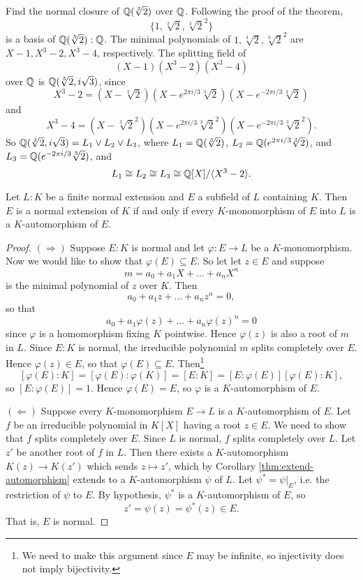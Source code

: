 \begin{example}
  Find the normal closure of $\mathbb{Q}(\sqrt[3]{2})$ over $\mathbb{Q}$.
  Following the proof of the theorem,
  \[
    \{1, \sqrt[3]{2}, \sqrt[3]{2}^2\}
  \]
  is a basis of $\mathbb{Q}(\sqrt[3]{2}) : \mathbb{Q}$. The minimal
  polynomials of $1, \sqrt[3]{2}, \sqrt[3]{2}^2$ are
  $X - 1, X^3 - 2, X^3 - 4$, respectively. The
  splitting field of
  \[
    (X - 1)(X^3 - 2)(X^3 - 4)
  \]
  over $\mathbb{Q}$ is $\mathbb{Q}(\sqrt[3]{2}, i\sqrt{3})$, since
  \[
    X^3 - 2 = (X - \sqrt[3]{2})(X - e^{2\pi i / 3} \sqrt[3]{2})(X - e^{-2\pi i / 3} \sqrt[3]{2})
  \]
  and
  \[
    X^3 - 4 = (X - \sqrt[3]{2}^2)(X - e^{2\pi i / 3} \sqrt[3]{2}^2)(X - e^{-2\pi i / 3} \sqrt[3]{2}^2).
  \]
  So $\mathbb{Q}(\sqrt[3]{2}, i\sqrt{3}) = L_1 \lor L_2 \lor L_3$,
  where $L_1 = \mathbb{Q}(\sqrt[3]{2})$, $L_2 = \mathbb{Q}(e^{2\pi i / 3} \sqrt[3]{2})$,
  and $L_3 = \mathbb{Q}(e^{-2\pi i / 3} \sqrt[3]{2})$, and
  \[
    L_1 \cong L_2 \cong L_3 \cong \mathbb{Q}[X] / \langle X^3 - 2 \rangle.
  \]
\end{example}

\begin{theorem}
  Let $L : K$ be a finite normal extension and $E$ a
  subfield
  of $L$ containing $K$. Then $E$ is a normal extension
  of $K$ if and only if every $K$-monomorphism of
  $E$ into $L$ is a $K$-automorphism of $E$.
\end{theorem}

\begin{proof}
  $(\Rightarrow)$ Suppose $E : K$ is normal and
  let $\varphi : E \to L$ be a $K$-monomorphism. Now we
  would like to show that $\varphi(E) \subseteq E$. So let
  let $z \in E$ and suppose
  \[
    m = a_0 + a_1 X + \dots + a_n X^n
  \]
  is the minimal polynomial of $z$ over $K$. Then
  \[
    a_0 + a_1z + \dots + a_nz^n = 0,
  \]
  so that
  \[
    a_0 + a_1\varphi(z) + \dots + a_n\varphi(z)^n = 0
  \]
  since $\varphi$ is a homomorphism fixing $K$ pointwise.
  Hence $\varphi(z)$ is also a root of $m$ in $L$.
  Since $E : K$ is normal, the irreducible polynomial
  $m$ splits completely over $E$. Hence
  $\varphi(z) \in E$, so that $\varphi(E) \subseteq E$.
  Then\footnote{We need to make this argument since $E$ may be infinite, so injectivity does not imply bijectivity.}
  \[
    [\varphi(E) : K] = [\varphi(E) : \varphi(K)]
    = [E : K] = [E : \varphi(E)][\varphi(E) : K],
  \]
  so $[E : \varphi(E)] = 1$. Hence $\varphi(E) = E$,
  so $\varphi$ is a $K$-automorphism of $E$.

  $(\Leftarrow)$ Suppose every $K$-monomorphism
  $E \to L$ is a $K$-automorphism of $E$. Let $f$
  be an irreducible polynomial in $K[X]$ having a root
  $z \in E$. We need to show that $f$ splits completely
  over $E$. Since $L$ is normal, $f$ splits completely
  over $L$. Let $z'$ be another root of $f$ in $L$.
  Then there exists a $K$-automorphism
  $K(z) \to K(z')$ which sends $z \mapsto z'$,
  which by Corollary \ref{thm:extend-automorphism}
  extends to a $K$-automorphism $\psi$ of $L$. Let
  $\psi^* = \psi|_E$, i.e. the restriction of $\psi$
  to $E$. By hypothesis, $\psi^*$ is a $K$-automorphism
  of $E$, so
  \[z' = \psi(z) = \psi^*(z) \in E.\]
  That is, $E$ is normal.
\end{proof}


